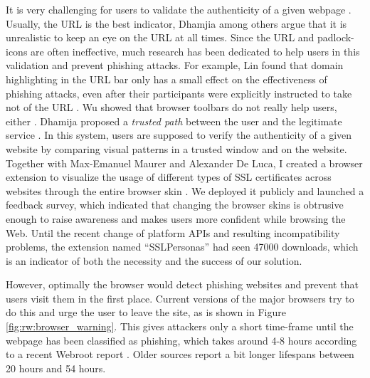 It is very challenging for users to validate the authenticity of a given webpage \cite{Dhamija2006WhyPhishingWorks, Fogg2001WhatMakesSitesCredible}. Usually, the URL is the best indicator, Dhamjia \etal among others argue that it is unrealistic to keep an eye on the URL at all times. Since the URL and padlock-icons are often ineffective, much research has been dedicated to help users in this validation and prevent phishing attacks. For example, Lin \etal found that domain highlighting in the URL bar only has a small effect on the effectiveness of phishing attacks, even after their participants were explicitly instructed to take not of the URL \cite{Lin2011DomainHighlighting}. Wu \etal showed that browser toolbars do not really help users, either \cite{Wu2006SecurityToolbars}. Dhamija \etal proposed a \textit{trusted path} between the user and the legitimate service \cite{Dhamija2005DynamicSecuritySkins}. In this system, users are supposed to verify the authenticity of a given website by comparing visual patterns in a trusted window and on the website. Together with Max-Emanuel Maurer and Alexander De Luca, I created a browser extension to visualize the usage of different types of SSL certificates across websites through the entire browser skin \cite{Maurer2011ShiningChrome}. We deployed it publicly and launched a feedback survey, which indicated that changing the browser skins is obtrusive enough to raise awareness and makes users more confident while browsing the Web. Until the recent change of platform APIs and resulting incompatibility problems, the extension named ``SSLPersonas'' had seen 47000 downloads, which is an indicator of both the necessity and the success of our solution. 

However, optimally the browser would detect phishing websites and prevent that users visit them in the first place. Current versions of the major browsers try to do this and urge the user to leave the site, as is shown in Figure \ref{fig:rw:browser_warning}. This gives attackers only a short time-frame until the webpage has been classified as phishing, which takes around 4-8 hours according to a recent Webroot report \cite{Webroot2017PhishingReport}. Older sources report a bit longer lifespans between 20 hours and 54 hours. 

